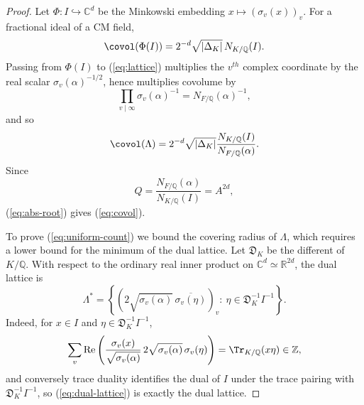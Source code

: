 \begin{proof}
Let $\Phi:I\hookrightarrow\mathbb{C}^d$ be the Minkowski embedding $x\mapsto(\sigma_v(x))_v$.  For a fractional ideal of a CM field,
\[
   \covol(\Phi(I))=2^{-d}\sqrt{|\Delta_K|}\,N_{K/\mathbb{Q}}(I).
\]
Passing from $\Phi(I)$ to (\ref{eq:lattice}) multiplies the $v^{th}$ complex coordinate by the real scalar $\sigma_v(\alpha)^{-1/2}$, hence multiplies covolume by
\[
   \prod_{v\mid\infty}\sigma_v(\alpha)^{-1}=N_{F/\mathbb{Q}}(\alpha)^{-1},
\]
and so
\[
   \covol(\Lambda)=2^{-d}\sqrt{|\Delta_K|}\frac{N_{K/\mathbb{Q}}(I)}{N_{F/\mathbb{Q}}(\alpha)}.
\]
Since
\[
   Q=\frac{N_{F/\mathbb{Q}}(\alpha)}{N_{K/\mathbb{Q}}(I)}=A^{2d},
\]
(\ref{eq:abs-root}) gives (\ref{eq:covol}).

To prove (\ref{eq:uniform-count}) we bound the covering radius of $\Lambda$, which requires a lower bound for the minimum of the dual lattice.  Let $\mathfrak D_K$ be the different of $K/\mathbb{Q}$.  With respect to the ordinary real inner product on $\mathbb{C}^d\simeq\mathbb{R}^{2d}$, the dual lattice is
\begin{equation}\label{eq:dual-lattice}
   \Lambda^*=\left\{
   \left(2\sqrt{\sigma_v(\alpha)}\,\overline{\sigma_v(\eta)}\right)_v:\
   \eta\in\mathfrak D_K^{-1}I^{-1}
   \right\}.
\end{equation}
Indeed, for $x\in I$ and $\eta\in\mathfrak D_K^{-1}I^{-1}$,
\[
   \sum_v \operatorname{Re}\left(\frac{\sigma_v(x)}{\sqrt{\sigma_v(\alpha)}}
   \,2\sqrt{\sigma_v(\alpha)}\,\sigma_v(\eta)\right)=\Tr_{K/\mathbb{Q}}(x\eta)\in\mathbb{Z},
\]
and conversely trace duality identifies the dual of $I$ under the trace pairing with $\mathfrak D_K^{-1}I^{-1}$, so (\ref{eq:dual-lattice}) is exactly the dual lattice.


\end{proof}
